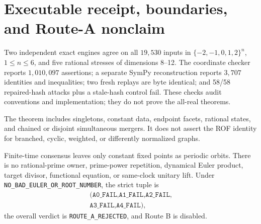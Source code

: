 \documentclass[10pt]{article}
\begin{document}
\section{Executable receipt, boundaries, and Route-A nonclaim}
Two independent exact engines agree on all $19{,}530$ inputs in
$\{-2,-1,0,1,2\}^n$, $1\leq n\leq6$, and five rational stresses of dimensions
8--12.  The coordinate checker reports $1{,}010{,}097$ assertions; a separate
SymPy reconstruction reports $3{,}707$ identities and inequalities; two fresh
replays are byte identical; and 58/58 repaired-hash attacks plus a stale-hash
control fail.  These checks audit conventions and implementation; they do not
prove the all-real theorems.

The theorem includes singletons, constant data, endpoint facets, rational
states, and chained or disjoint simultaneous mergers.  It does not assert the
ROF identity for branched, cyclic, weighted, or differently normalized graphs.

Finite-time consensus leaves only constant fixed points as periodic orbits.
There is no rational-prime owner, prime-power repetition, dynamical Euler
product, target divisor, functional equation, or same-clock unitary lift.
Under \texttt{NO\_BAD\_EULER\_OR\_ROOT\_NUMBER}, the strict tuple is
\[
 \begin{gathered}
 \texttt{(A0\_FAIL,A1\_FAIL,A2\_FAIL,}\\[-2pt]
 \texttt{A3\_FAIL,A4\_FAIL)},
 \end{gathered}
\]
the overall verdict is \texttt{ROUTE\_A\_REJECTED}, and Route B is disabled.
\fi
\end{document}
